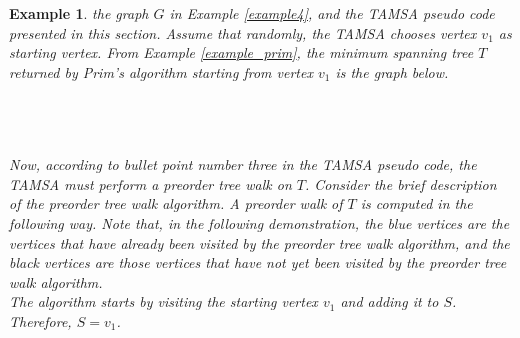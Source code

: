 \documentclass[12pt]{article}
\newtheorem{example}[definition]{Example}
\numberwithin{equation}{subsection}
\numberwithin{table}{subsection}
\begin{document}
\begin{example}
\label{tamsa_demonstration}
 the graph $G$ in Example \ref{example4}, and the TAMSA pseudo code presented in this section. Assume that randomly, the TAMSA chooses vertex $v_1$ as starting vertex. From Example \ref{example_prim}, the minimum spanning tree $T$ returned by Prim's algorithm starting from vertex $v_1$ is the graph below.\\\\
\\\\
Now, according to bullet point number three in the TAMSA pseudo code, the TAMSA must perform a preorder tree walk on $T$. Consider the brief description of the preorder tree walk algorithm. A preorder walk of $T$ is computed in the following way. Note that, in the following demonstration, the blue vertices are the vertices that have already been visited by the preorder tree walk algorithm, and the black vertices are those vertices that have not yet been visited by the preorder tree walk algorithm.\\
The algorithm starts by visiting the starting vertex $v_1$ and adding it to $S$. Therefore, $S = v_1$.
\\\\
\end{example}
\end{document}
